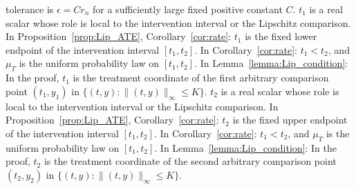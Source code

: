 \documentclass[12pt]{article}
\theoremstyle{plain}
\theoremstyle{definition}
\theoremstyle{remark}
\begin{document}
tolerance is $\epsilon=Cr_n$ for a sufficiently large fixed positive constant $C$. $t_1$ is a real scalar whose role is local to the intervention interval or the Lipschitz comparison. In Proposition~\ref{prop:Lip_ATE}, Corollary~\ref{cor:rate}: $t_1$ is the fixed lower endpoint of the intervention interval $[t_1,t_2]$. In Corollary~\ref{cor:rate}: $t_1<t_2$, and $\mu_T$ is the uniform probability law on $[t_1,t_2]$. In Lemma~\ref{lemma:Lip_condition}: In the proof, $t_1$ is the treatment coordinate of the first arbitrary comparison point $(t_1,y_1)$ in $\{(t,y):\|(t,y)\|_\infty\leqslant K\}$. $t_2$ is a real scalar whose role is local to the intervention interval or the Lipschitz comparison. In Proposition~\ref{prop:Lip_ATE}, Corollary~\ref{cor:rate}: $t_2$ is the fixed upper endpoint of the intervention interval $[t_1,t_2]$. In Corollary~\ref{cor:rate}: $t_1<t_2$, and $\mu_T$ is the uniform probability law on $[t_1,t_2]$. In Lemma~\ref{lemma:Lip_condition}: In the proof, $t_2$ is the treatment coordinate of the second arbitrary comparison point $(t_2,y_2)$ in $\{(t,y):\|(t,y)\|_\infty\leqslant K\}$.
\end{document}
